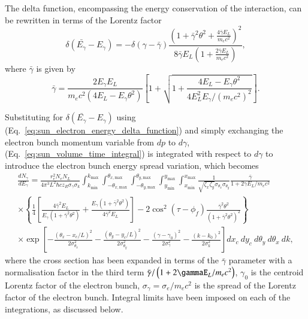 \documentclass[../main.tex]{subfiles}
\begin{document}
The delta function, encompassing the energy conservation of the interaction, can be rewritten in terms of the Lorentz factor
\begin{equation}
\delta\left(\bar{E_{\gamma}}-E_{\gamma}\right) = -\delta\left(\gamma-\bar{\gamma}\right)\frac{\left(1+\bar{\gamma}^{2}\theta^{2}+\frac{4\bar{\gamma}E_{L}}{m_{e}c^{2}}\right)^{2}}{8\bar{\gamma}E_{L}\left(1+\frac{2\bar{\gamma}E_{L}}{m_{e}c^{2}}\right)},
\label{eq:sun_electron_energy_delta_function}    
\end{equation}
where $\bar{\gamma}$ is given by
\begin{equation}
\bar{\gamma} = \frac{2E_{\gamma}E_{L}}{m_{e}c^{2}\left(4E_{L}-E_{\gamma}\theta^{2}\right)}\left[1+\sqrt{1+\frac{4E_{L}-E_{\gamma}\theta^{2}}{4E_{L}^{2}E_{\gamma}/\left(m_{e}c^{2}\right)^{2}}}\right].    
\end{equation}

Substituting for $\delta\left(\bar{E_{\gamma}}-E_{\gamma}\right)$ using (Eq.~\ref{eq:sun_electron_energy_delta_function}) and simply exchanging the electron bunch momentum variable from $dp$ to $d\gamma$, (Eq.~\ref{eq:sun_volume_time_integral}) is integrated with respect to $d\gamma$ to introduce the electron bunch energy spread variation, which becomes
\begin{multline}
\frac{dN_{\gamma}}{dE_{\gamma}} = \frac{r_{e}^{2}N_{e}N_{L}}{4\pi^{3}L^{2}\hbar c z_{R}\sigma_{\gamma}\sigma_{k}}\int_{k_{\mathrm{min}}}^{k_{\mathrm{max}}}\int_{-\theta_{x,\mathrm{max}}}^{\theta_{x,\mathrm{max}}}\int_{-\theta_{y,\mathrm{max}}}^{\theta_{y,\mathrm{max}}}\int_{y_{\mathrm{min}}}^{y_{\mathrm{max}}}\int_{x_{\mathrm{min}}}^{x_{\mathrm{max}}}\frac{1}{\sqrt{\zeta_{x}\zeta_{y}}\sigma_{\theta_{x}}\sigma_{\theta_{y}}}\frac{\bar{\gamma}}{1+2\gamma E_{L}/m_{e}c^{2}} \\
\times\left\{\frac{1}{4}\left[\frac{4\bar{\gamma}^{2}E_{L}}{E_{\gamma}\left(1+\bar{\gamma}^{2}\theta^{2}\right)}+\frac{E_{\gamma}\left(1+\bar{\gamma}^{2}\theta^{2}\right)}{4\bar{\gamma}^{2}E_{L}}\right]-2\cos^{2}\left(\tau-\phi_{f}\right)\frac{\bar{\gamma}^{2}\theta^{2}}{\left(1+\bar{\gamma}^{2}\theta^{2}\right)^{2}}\right\} \\
\times\exp{\left[-\frac{\left(\theta_{x}-x_{c}/L\right)^{2}}{2\sigma_{\theta_{x}}^{2}}-\frac{\left(\theta_{y}-y_{c}/L\right)^{2}}{2\sigma_{\theta_{y}}^{2}}-\frac{\left(\gamma-\gamma_{0}\right)^{2}}{2\sigma_{\gamma}^{2}}-\frac{\left(k-k_{0}\right)^{2}}{2\sigma_{k}^{2}}\right]}dx_{c}~dy_{c}~d\theta_{y}~d\theta_{x}~dk,
\label{eq:ICARUS_equation}
\end{multline}
where the cross section has been expanded in terms of the $\bar{\gamma}$ parameter with a normalisation factor in the third term $\bar{\gamma}/\left(1+2\gammaE_{L}/m_{e}c^{2}\right)$, $\gamma_{0}$ is the centroid Lorentz factor of the electron bunch, $\sigma_{\gamma} = \sigma_{e}/m_{e}c^{2}$ is the spread of the Lorentz factor of the electron bunch. Integral limits have been imposed on each of the integrations, as discussed below. 
\end{document}
